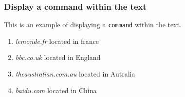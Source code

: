 \subsubsection{Display a command within the text}

This is an example of displaying a \verb+command+ within the text.

\begin{enumerate}
    \item \emph{lemonde.fr} located in france
    \item \emph{bbc.co.uk} located in England
    \item \emph{theaustralian.com.au} located in Autralia
    \item \emph{baidu.com} located in China
\end{enumerate}

